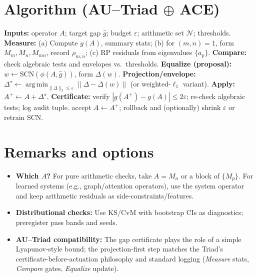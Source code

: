 \documentclass[11pt]{article}
\newcommand{\argmin}{\operatorname*{arg\,min}}
\begin{document}
\section{Algorithm (AU--Triad $\oplus$ ACE)}
\begin{algorithm}[H]
\caption{One certified integration step}
\begin{algorithmic}[1]
\State \textbf{Inputs:} operator $A$; target gap $\hat g$; budget $\varepsilon$; arithmetic set $\mathcal{N}$; thresholds.
\State \textbf{Measure:}
\Statex \quad (a) Compute $g(A)$, summary stats; (b) for $(m,n)=1$, form $M_m,M_n,M_{mn}$, record $\rho_{m,n}$; 
\Statex \quad (c) RP residuals from eigenvalues $\{a_p\}$.
\State \textbf{Compare:} check algebraic tests and envelopes vs.\ thresholds.
\State \textbf{Equalize (proposal):} $w\gets \mathrm{SCN}(\phi(A,\hat g))$, form $\Delta(w)$.
\State \textbf{Projection/envelope:} $\Delta^\star\gets \argmin_{\|\Delta\|_2\le \varepsilon}\|\Delta-\Delta(w)\|$ (or weighted-$\ell_1$ variant).
\State \textbf{Apply:} $A^+\gets A+\Delta^\star$. 
\State \textbf{Certificate:} verify $|g(A^+)-g(A)|\le 2\varepsilon$; re-check algebraic tests; log audit tuple.
 \State accept $A\leftarrow A^+$; \Else \State rollback and (optionally) shrink $\varepsilon$ or retrain SCN. \EndIf
\end{algorithmic}
\end{algorithm}

\section{Remarks and options}
\begin{itemize}
\item \textbf{Which $A$?} For pure arithmetic checks, take $A=M_n$ or a block of $\{M_p\}$. 
For learned systems (e.g., graph/attention operators), use the system operator and keep arithmetic residuals as side-constraints/features.
\item \textbf{Distributional checks:} Use KS/CvM with bootstrap CIs as diagnostics; preregister pass bands and seeds.
\item \textbf{AU--Triad compatibility:} The gap certificate plays the role of a simple Lyapunov-style bound; the projection-first step matches the Triad’s certificate-before-actuation philosophy and standard logging (\emph{Measure} stats, \emph{Compare} gates, \emph{Equalize} update).
\end{itemize}
\end{document}
